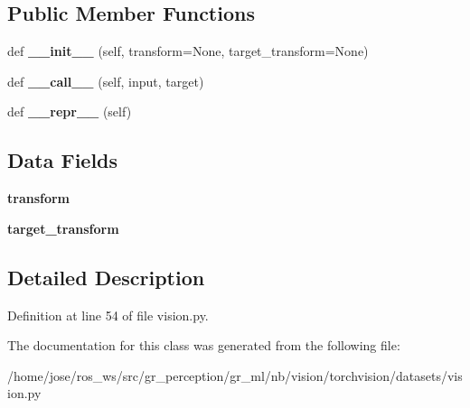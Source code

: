 \subsection*{Public Member Functions}
\begin{DoxyCompactItemize}
\item 
\mbox{\label{classtorchvision_1_1datasets_1_1vision_1_1StandardTransform_ac8970ec6788d0e3d8aec11c113004d4a}} 
def {\bfseries \+\_\+\+\_\+init\+\_\+\+\_\+} (self, transform=None, target\+\_\+transform=None)
\item 
\mbox{\label{classtorchvision_1_1datasets_1_1vision_1_1StandardTransform_a3c3276ade7893bc977dd224b3a4b7fa2}} 
def {\bfseries \+\_\+\+\_\+call\+\_\+\+\_\+} (self, input, target)
\item 
\mbox{\label{classtorchvision_1_1datasets_1_1vision_1_1StandardTransform_a6da97fc74ee55fb34c0ddbc14fec12ad}} 
def {\bfseries \+\_\+\+\_\+repr\+\_\+\+\_\+} (self)
\end{DoxyCompactItemize}
\subsection*{Data Fields}
\begin{DoxyCompactItemize}
\item 
\mbox{\label{classtorchvision_1_1datasets_1_1vision_1_1StandardTransform_aac9ea7762864eac38358930f35ad1101}} 
{\bfseries transform}
\item 
\mbox{\label{classtorchvision_1_1datasets_1_1vision_1_1StandardTransform_ad4673083af285582d1832500eccb4a0f}} 
{\bfseries target\+\_\+transform}
\end{DoxyCompactItemize}


\subsection{Detailed Description}


Definition at line 54 of file vision.\+py.



The documentation for this class was generated from the following file\+:\begin{DoxyCompactItemize}
\item 
/home/jose/ros\+\_\+ws/src/gr\+\_\+perception/gr\+\_\+ml/nb/vision/torchvision/datasets/vision.\+py\end{DoxyCompactItemize}
